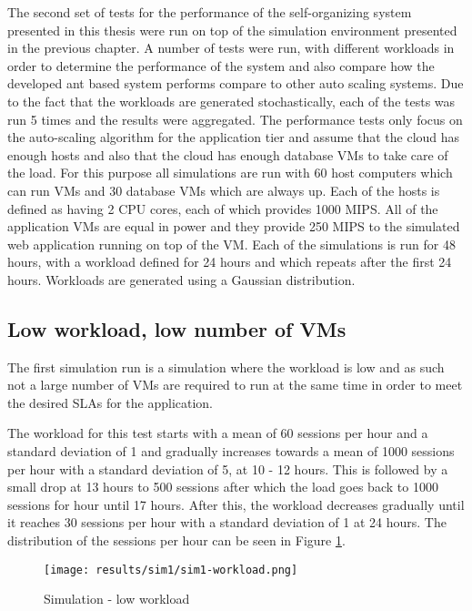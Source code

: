 The second set of tests for the performance of the self-organizing system presented in this thesis were run on top of the simulation environment presented in the previous chapter. A number of tests were run, with different workloads in order to determine the performance of the system and also compare how the developed ant based system performs compare to other auto scaling systems. Due to the fact that the workloads are generated stochastically, each of the tests was run 5 times and the results were aggregated. The performance tests only focus on the auto-scaling algorithm for the application tier and assume that the cloud has enough hosts and also that the cloud has enough database VMs to take care of the load. For this purpose all simulations are run with 60 host computers which can run VMs and 30 database VMs which are always up. Each of the hosts is defined as having 2 CPU cores, each of which provides 1000 MIPS. All of the application VMs are equal in power and they provide 250 MIPS to the simulated web application running on top of the VM. Each of the simulations is run for 48 hours, with a workload defined for 24 hours and which repeats after the first 24 hours. Workloads are generated using a Gaussian distribution.

\subsection{Low workload, low number of VMs}

The first simulation run is a simulation where the workload is low and as such not a large number of VMs are required to run at the same time in order to meet the desired SLAs for the application.

The workload for this test starts with a mean of 60 sessions per hour and a standard deviation of 1 and gradually increases towards a mean of 1000 sessions per hour with a standard deviation of 5, at 10 - 12 hours. This is followed by a small drop at 13 hours to 500 sessions after which the load goes back to 1000 sessions for hour until 17 hours. After this, the workload decreases gradually until it reaches 30 sessions per hour with a standard deviation of 1 at 24 hours. The distribution of the sessions per hour can be seen in Figure \ref{fig:sim1-workload}.

\begin{figure}
	\centering
		\texttt{[image: results/sim1/sim1-workload.png]}
	\caption{Simulation - low workload}
	\label{fig:sim1-workload}
\end{figure}

